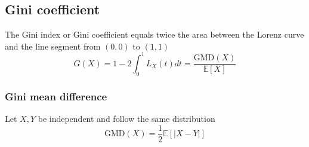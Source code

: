 \subsection{Gini coefficient}
The Gini index or Gini coefficient equals twice the area between the Lorenz curve
and the line segment from $(0,0)$ to $(1,1)$
\[ G(X) = 1-2\int_0^1L_X(t)dt = \frac{\text{GMD}(X)}{\mathbb{E}[X]} \]
\subsubsection{Gini mean difference}
Let $X,Y$ be independent and follow the same distribution
\[ \text{GMD}(X) = \frac{1}{2}\mathbb{E}[|X-Y|] \]


